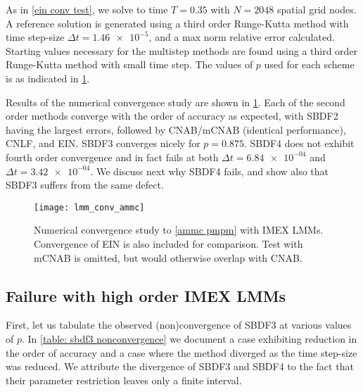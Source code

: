 As in \cref{ein conv test}, we solve to time $T=0.35$ with $N=2048$ spatial grid nodes. A reference solution is generated using a third order Runge-Kutta method with time step-size $\Delta t = \num{1.46e-5}$, and a max norm relative error calculated. Starting values necessary for the multistep methods are found using a third order Runge-Kutta method with small time step. The values of $p$ used for each scheme is as indicated in \cref{lmm conv test}.

Results of the numerical convergence study are shown in \cref{lmm conv test}. Each of the second order methods converge with the order of accuracy as expected, with SBDF2 having the largest errors, followed by CNAB/mCNAB (identical performance), CNLF, and EIN. SBDF3 converges nicely for $p=0.875$. SBDF4 does not exhibit fourth order convergence and in fact fails at both $\Delta t =\num{6.84e-04}$ and $\Delta t=\num{3.42e-04}$. We discuss next why SBDF4 fails, and show also that SBDF3 suffers from the same defect.

\begin{figure}
        \centering
\texttt{[image: lmm\_conv\_ammc]}
\caption[Numerical convergence study with IMEX LMMs]{Numerical convergence study to \cref{ammc pmpm} with IMEX LMMs. Convergence of EIN is also included for comparison. Test with mCNAB is omitted, but would otherwise overlap with CNAB.}
\label{lmm conv test}
\end{figure}

\subsection{Failure with high order IMEX LMMs}
First, let us tabulate the observed (non)convergence of SBDF3 at various values of $p$. In \cref{table: sbdf3 nonconvergence} we document a case exhibiting reduction in the order of accuracy and a case where the method diverged as the time step-size was reduced. We attribute the divergence of SBDF3 and SBDF4 to the fact that their parameter restriction leaves only a finite interval.

